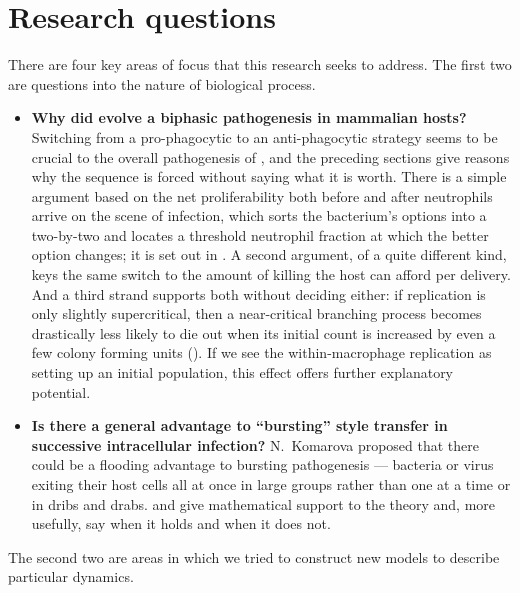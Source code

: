 \section{Research questions}

There are four key areas of focus that this research seeks to address. The
first two are questions into the nature of biological process.

\begin{itemize}
\item \textbf{Why did \yp{} evolve a biphasic pathogenesis in mammalian hosts?}
Switching from a pro-phagocytic to an anti-phagocytic strategy seems to be
crucial to the overall pathogenesis of \yp{}, and the preceding sections give
reasons why the sequence is forced without saying what it is worth. There is a
simple argument based on the net proliferability both before and after
neutrophils arrive on the scene of infection, which sorts the bacterium's
options into a two-by-two and locates a threshold neutrophil fraction at which
the better option changes; it is set out in
. A second argument, of a quite different
kind, keys the same switch to the amount of killing the host can afford per
delivery. And a third strand supports both without deciding either: if \yp{}
replication is only slightly supercritical, then a near-critical branching
process becomes drastically less likely to die out when its initial count is
increased by even a few colony forming units
(). If we see the within-macrophage
replication as setting up an initial population, this effect offers further
explanatory potential.

\item \textbf{Is there a general advantage to ``bursting'' style transfer in
successive intracellular infection?} N.~Komarova proposed that there could be a
flooding advantage to bursting pathogenesis --- bacteria or virus exiting their
host cells all at once in large groups rather than one at a time or in dribs
and drabs.  and
 give mathematical support to the theory and,
more usefully, say when it holds and when it does not.
\end{itemize}

\noindent
The second two are areas in which we tried to construct new models to describe
particular dynamics.


